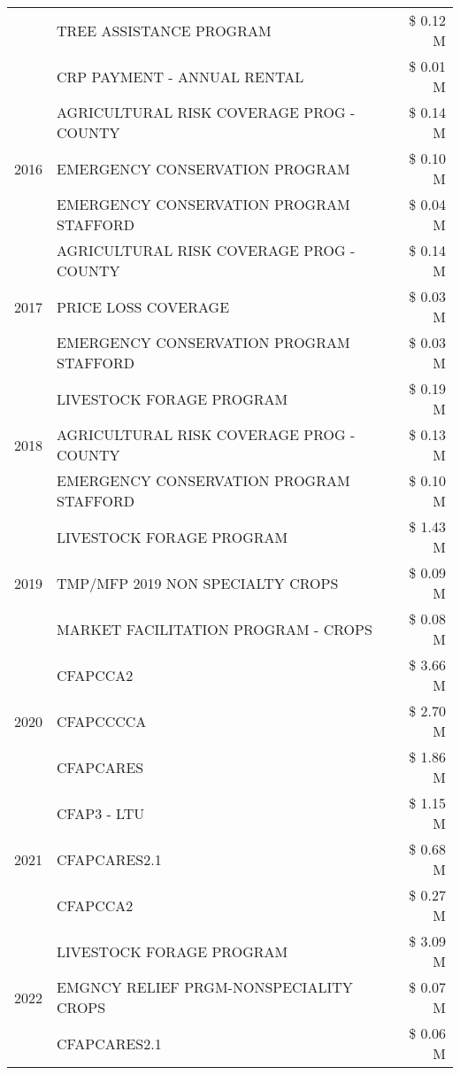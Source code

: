 \begin{tabular}{llr}
 & TREE ASSISTANCE PROGRAM & \$ 0.12 M \\
 & CRP PAYMENT - ANNUAL RENTAL & \$ 0.01 M \\
\cline{1-3}
\multirow[t]{3}{*}{2016} & AGRICULTURAL RISK COVERAGE PROG - COUNTY & \$ 0.14 M \\
 & EMERGENCY CONSERVATION PROGRAM & \$ 0.10 M \\
 & EMERGENCY CONSERVATION PROGRAM STAFFORD & \$ 0.04 M \\
\cline{1-3}
\multirow[t]{3}{*}{2017} & AGRICULTURAL RISK COVERAGE PROG - COUNTY & \$ 0.14 M \\
 & PRICE LOSS COVERAGE & \$ 0.03 M \\
 & EMERGENCY CONSERVATION PROGRAM STAFFORD & \$ 0.03 M \\
\cline{1-3}
\multirow[t]{3}{*}{2018} & LIVESTOCK FORAGE PROGRAM & \$ 0.19 M \\
 & AGRICULTURAL RISK COVERAGE PROG - COUNTY & \$ 0.13 M \\
 & EMERGENCY CONSERVATION PROGRAM STAFFORD & \$ 0.10 M \\
\cline{1-3}
\multirow[t]{3}{*}{2019} & LIVESTOCK FORAGE PROGRAM & \$ 1.43 M \\
 & TMP/MFP 2019 NON SPECIALTY CROPS & \$ 0.09 M \\
 & MARKET FACILITATION PROGRAM - CROPS & \$ 0.08 M \\
\cline{1-3}
\multirow[t]{3}{*}{2020} & CFAPCCA2 & \$ 3.66 M \\
 & CFAPCCCCA & \$ 2.70 M \\
 & CFAPCARES & \$ 1.86 M \\
\cline{1-3}
\multirow[t]{3}{*}{2021} & CFAP3 - LTU & \$ 1.15 M \\
 & CFAPCARES2.1 & \$ 0.68 M \\
 & CFAPCCA2 & \$ 0.27 M \\
\cline{1-3}
\multirow[t]{3}{*}{2022} & LIVESTOCK FORAGE PROGRAM & \$ 3.09 M \\
 & EMGNCY RELIEF PRGM-NONSPECIALITY CROPS & \$ 0.07 M \\
 & CFAPCARES2.1 & \$ 0.06 M \\
\cline{1-3}
\bottomrule
\end{tabular}
